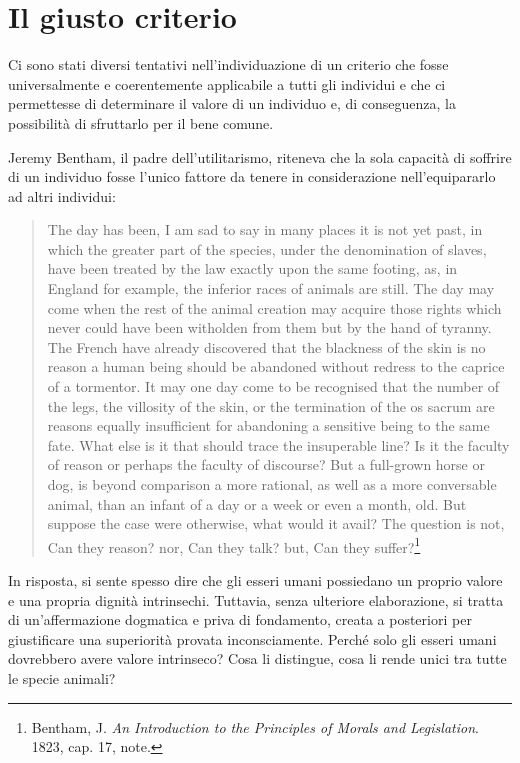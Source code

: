 \documentclass[a4paper,11pt,oneside,article]{memoir}
\begin{document}
\chapter{Il giusto criterio}

Ci sono stati diversi tentativi nell'individuazione di un criterio che fosse
universalmente e coerentemente applicabile a tutti gli individui e che ci
permettesse di determinare il valore di un individuo e, di conseguenza, la
possibilità di sfruttarlo per il bene comune.

Jeremy Bentham, il padre dell'utilitarismo, riteneva che la sola capacità di
soffrire di un individuo fosse l'unico fattore da tenere in considerazione
nell'equipararlo ad altri individui:

\begin{quotation}

The day has been, I am sad to say in many places it is not yet past, in which
the greater part of the species, under the denomination of slaves, have been
treated by the law exactly upon the same footing, as, in England for example,
the inferior races of animals are still. The day may come when the rest of the
animal creation may acquire those rights which never could have been witholden
from them but by the hand of tyranny. The French have already discovered that
the blackness of the skin is no reason a human being should be abandoned without
redress to the caprice of a tormentor. It may one day come to be recognised that
the number of the legs, the villosity of the skin, or the termination of the os
sacrum are reasons equally insufficient for abandoning a sensitive being to the
same fate. What else is it that should trace the insuperable line? Is it the
faculty of reason or perhaps the faculty of discourse? But a full-grown horse or
dog, is beyond comparison a more rational, as well as a more conversable animal,
than an infant of a day or a week or even a month, old. But suppose the case
were otherwise, what would it avail? The question is not, Can they reason? nor,
Can they talk? but, Can they suffer?\footnote{Bentham, J. \emph{An Introduction
to the Principles of Morals and Legislation}. 1823, cap. 17, note.}

\end{quotation}

In risposta, si sente spesso dire che gli esseri umani possiedano un proprio
valore e una propria dignità intrinsechi. Tuttavia, senza ulteriore
elaborazione, si tratta di un'affermazione dogmatica e priva di fondamento,
creata a posteriori per giustificare una superiorità provata inconsciamente.
Perché solo gli esseri umani dovrebbero avere valore intrinseco? Cosa li
distingue, cosa li rende unici tra tutte le specie animali?
\end{document}
